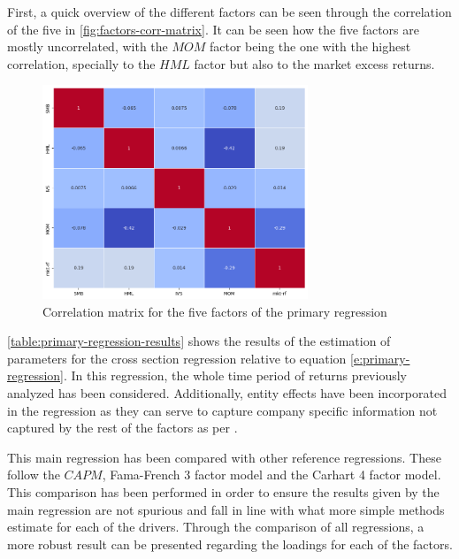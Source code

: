 First, a quick overview of the different factors can be seen through the correlation of the five in \autoref{fig:factors-corr-matrix}. It can be seen how the five factors are mostly uncorrelated, with the $MOM$ factor being the one with the highest correlation, specially to the $HML$ factor but also to the market excess returns. 
\begin{figure}[ht]
    \centering
    \includegraphics[width=300px]{assets/factors-corr-matrix.png}
    \caption{Correlation matrix for the five factors of the primary regression}
    \label{fig:factors-corr-matrix}
\end{figure}

\autoref{table:primary-regression-results} shows the results of the estimation of parameters for the cross section regression relative to equation \eqref{e:primary-regression}. In this regression, the whole time period of returns previously analyzed has been considered. Additionally, entity effects have been incorporated in the regression as they can serve to capture company specific information not captured by the rest of the factors as per \cite{ian_wagner_2019}. 

This main regression has been compared with other reference regressions. These follow the $CAPM$, Fama-French 3 factor model and the Carhart 4 factor model. This comparison has been performed in order to ensure the results given by the main regression are not spurious and fall in line with what more simple methods estimate for each of the drivers. Through the comparison of all regressions, a more robust result can be presented regarding the loadings for each of the factors. 

